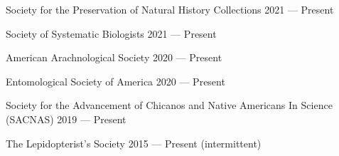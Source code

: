 

\begin{cvskills}

  \cvskill
    {Society for the Preservation of Natural History Collections} %
    {2021 — Present} %

  \cvskill
    {Society of Systematic Biologists} %
    {2021 — Present} %


  \cvskill
    {American Arachnological Society} %
    {2020 — Present} %

  \cvskill
    {Entomological Society of America} %
    {2020 — Present} %
    
  \cvskill
    {Society for the Advancement of Chicanos and Native Americans In Science (SACNAS)} %
    {2019 — Present} %
    
  \cvskill
    {The Lepidopterist's Society} %
    {2015 — Present (intermittent)} %

\end{cvskills}
